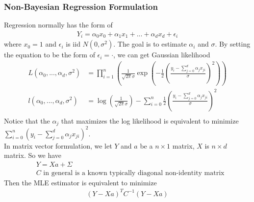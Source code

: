 \subsubsection{Non-Bayesian Regression Formulation}
Regression normally has the form of 
    \begin{align*}
        Y_i = \alpha_0 x_0 + \alpha_1 x_1 + ... + \alpha_d x_d + \epsilon_i
    \end{align*}
where $x_0 = 1$ and $\epsilon_i$ is iid $N(0, \sigma^2)$. The goal is to estimate $\alpha_i$ and $\sigma$. By setting the equation to be the form of $\epsilon_i = \cdot$, we can get Gaussian likelihood 
    \begin{align*}
        L(\alpha_0, ..., \alpha_d, \sigma^2) 
        & = \prod_{i=1}^n\left(\frac{1}{\sqrt{2\pi}\sigma} \exp\left(-\frac{1}{2}(\frac{y_i - \sum_{j=0}^{d} \alpha_j x_{ji}}{\sigma})^2  \right) \right) \\
        l(\alpha_0, ..., \alpha_d, \sigma^2)
        & = \log(\frac{1}{\sqrt{2\pi}\sigma}) - \sum_{i=0}^n \frac{1}{2} \left(\frac{y_i - \sum_{j=0}^d \alpha_j x_{ji}}{\sigma} \right)^2 \\
    \end{align*}
Notice that the $\alpha_{j}$ that maximizes the log likelihood is equivalent to minimize $\sum_{i=0}^n(y_i - \sum_{j=0}^{d} \alpha_j x_{ji})^2$.\\
In matrix vector formulation, we let $Y$ and $a$ be a $n \times 1$ matrix, $X$ is $n\times d$ matrix. So we have 
    \begin{align*}
        & Y = Xa + \Sigma \tag{$\Sigma \sim N(0, \sigma^2 C)$}\\
        & \text{$C$ in general is a known typically diagonal non-identity matrix}
    \end{align*}
Then the MLE estimator is equivalent to minimize 
    \begin{align*}
        (Y-Xa)^T C^{-1} (Y-Xa)
    \end{align*}
    
